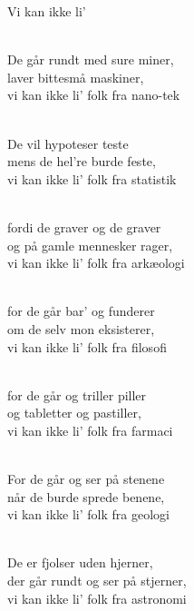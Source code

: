 \begin{song}{Vi kan ikke li'}
  \begin{SBVerse}
    \\
    De går rundt med sure miner,\\
    laver bittesmå maskiner,\\
    vi kan ikke li' folk fra nano-tek
  \end{SBVerse}

  \begin{SBVerse}
    \\
    De vil hypoteser teste\\
    mens de hel're burde feste,\\
    vi kan ikke li' folk fra statistik
  \end{SBVerse}

  \begin{SBVerse}
    \\
    fordi de graver og de graver\\
    og på gamle mennesker rager,\\
    vi kan ikke li' folk fra arkæologi
  \end{SBVerse}

  \begin{SBVerse}
    \\
    for de går bar' og funderer\\
    om de selv mon eksisterer,\\
    vi kan ikke li' folk fra filosofi
  \end{SBVerse}

  \begin{SBVerse}
    \\
    for de går og triller piller\\
    og tabletter og pastiller,\\
    vi kan ikke li' folk fra farmaci
  \end{SBVerse}

  \begin{SBVerse}
    \\
    For de går og ser på stenene\\
    når de burde sprede benene,\\
    vi kan ikke li' folk fra geologi
  \end{SBVerse}

  \begin{SBVerse}
    \\
    De er fjolser uden hjerner,\\
    der går rundt og ser på stjerner,\\
    vi kan ikke li' folk fra astronomi
  \end{SBVerse}


\end{song}
